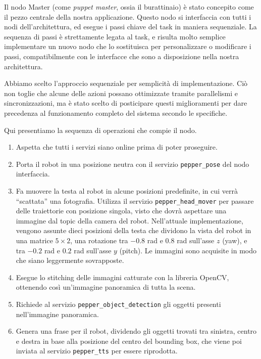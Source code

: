 Il nodo Master (come \emph{puppet master}, ossia il burattinaio) è stato concepito come il pezzo centrale della nostra applicazione. Questo nodo si interfaccia con tutti i nodi dell'architettura, ed esegue i passi chiave del task in maniera sequenziale. La sequenza di passi è strettamente legata al task, e risulta molto semplice implementare un nuovo nodo che lo sostituisca per personalizzare o modificare i passi, compatibilmente con le interfacce che sono a disposizione nella nostra architettura.

Abbiamo scelto l'approccio sequenziale per semplicità di implementazione. Ciò non toglie che alcune delle azioni possano ottimizzate tramite parallelismi e sincronizzazioni, ma è stato scelto di posticipare questi miglioramenti per dare precedenza al funzionamento completo del sistema secondo le specifiche.

Qui presentiamo la sequenza di operazioni che compie il nodo.
\begin{enumerate}
	\item Aspetta che tutti i servizi siano online prima di poter proseguire.
	\item Porta il robot in una posizione neutra con il servizio \verb|pepper_pose| del nodo interfaccia. 
	\item Fa muovere la testa al robot in alcune posizioni predefinite, in cui verrà ``scattata'' una fotografia. Utilizza il servizio \verb|pepper_head_mover| per passare delle traiettorie con posizione singola, visto che dovrà aspettare una immagine dal topic della camera del robot. Nell'attuale implementazione, vengono assunte dieci posizioni della testa che dividono la vista del robot in una matrice $5 \times 2$, una rotazione tra $-0.8$ rad e $0.8$ rad sull'asse $z$ (yaw), e tra $-0.2$ rad e $0.2$ rad sull'asse $y$ (pitch). Le immagini sono acquisite in modo che siano leggermente sovrapposte.
	\item Esegue lo stitching delle immagini catturate con la libreria OpenCV, ottenendo così un'immagine panoramica di tutta la scena.
	\item Richiede al servizio \verb|pepper_object_detection| gli oggetti presenti nell'immagine panoramica.
	\item Genera una frase per il robot, dividendo gli oggetti trovati tra sinistra, centro e destra in base alla posizione del centro del bounding box, che viene poi inviata al servizio \verb|pepper_tts| per essere riprodotta.
\end{enumerate}

